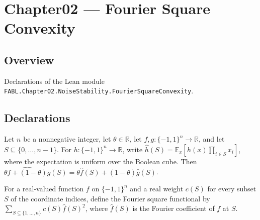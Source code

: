 \chapter{Chapter02 — Fourier Square Convexity}
\section{Overview}

Declarations of the Lean module \texttt{FABL.Chapter02.NoiseStability.FourierSquareConvexity}.

\section{Declarations}

\begin{theorem}
\label{FABL.fourierCoeff_affineCombination}
\leanok
{}
Let $n$ be a nonnegative integer, let $\theta\in\mathbb R$, let
$f,g:\{-1,1\}^n\to\mathbb R$, and let $S\subseteq\{0,\ldots,n-1\}$. For
$h:\{-1,1\}^n\to\mathbb R$, write $\widehat h(S)=\mathbb E_x[h(x)\prod_{i\in S}x_i]$,
where the expectation is uniform over the Boolean cube. Then $\widehat{\theta
f+(1-\theta)g}(S)=\theta\widehat f(S)+(1-\theta)\widehat g(S)$.
\end{theorem}

\begin{definition}
\label{FABL.fourierSquareFunctional}
\leanok
{}
For a real-valued function $f$ on $\{-1,1\}^n$ and a real weight $c(S)$ for every subset
$S$ of the coordinate indices, define the Fourier square functional by
$\sum_{S\subseteq\{1,\ldots,n\}}c(S)\widehat f(S)^2$, where $\widehat f(S)$ is the
Fourier coefficient of $f$ at $S$.
\end{definition}

